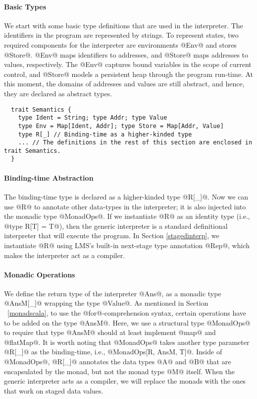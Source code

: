 \paragraph{Basic Types} 
We start with some basic type definitions that are used in the interpreter. The
identifiers in the program are represented by strings. To represent states, two
required components for the interpreter are environments @Env@ and stores
@Store@. @Env@ maps identifiers to addresses, and @Store@ maps 
addresses to values, respectively. The @Env@ captures bound variables in the
scope of current control, and @Store@ models a persistent heap through the
program run-time.  At this moment, the domains of addresses and values are
still abstract, and hence, they are declared as abstract types.
\begin{lstlisting}
  trait Semantics {
    type Ident = String; type Addr; type Value
    type Env = Map[Ident, Addr]; type Store = Map[Addr, Value]
    type R[_] // Binding-time as a higher-kinded type
    ... // The definitions in the rest of this section are enclosed in trait Semantics.
  }
\end{lstlisting}

\paragraph{Binding-time Abstraction}
The binding-time type is declared as a higher-kinded type @R[_]@. 
Now we can use @R@ to annotate other data-types in the interpreter;
it is also injected into the monadic type @MonadOps@.  If we instantiate
@R@ as an identity type (i.e., @type R[T] = T@), then the generic interpreter is a
standard definitional interpreter that will execute the program.  In Section
\ref{stagedinterp}, we instantiate @R@ using LMS's built-in next-stage
type annotation @Rep@, which makes the interpreter act as a compiler.

\paragraph{Monadic Operations} We define the return type of the interpreter
@Ans@, as a monadic type @AnsM[_]@ wrapping the type @Value@. 
As mentioned in Section ~\ref{monadscala}, to use the @for@-comprehension
syntax, certain operations have to be added on the type @AnsM@. Here, we use a
structural type @MonadOps@ to require that type @AnsM@ should at least
implement @map@ and @flatMap@. It is worth noting that @MonadOps@ takes another
type parameter @R[_]@ as the binding-time, i.e., @MonadOps[R, AnsM, T]@.
Inside of @MonadOps@, @R[_]@ annotates the data types @A@ and @B@ that are
encapsulated by the monad, but not the monad type @M@ itself. When the generic
interpreter acts as a compiler, we will replace the monads with the ones that
work on staged data values.

